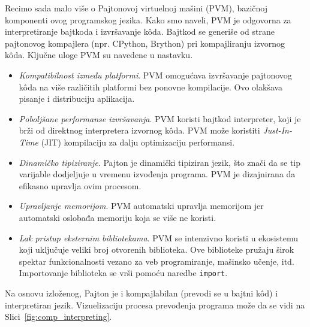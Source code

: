 Recimo sada malo više o Pajtonovoj virtuelnoj mašini (PVM), bazičnoj komponenti ovog programskog jezika. Kako smo naveli, PVM je odgovorna za interpretiranje bajtkoda i izvršavanje k\^oda. Bajtkod se generiše od strane pajtonovog kompajlera (npr. CPython, Brython) pri kompajliranju izvornog k\^oda. Ključne uloge PVM su navedene u nastavku.  
\begin{itemize}
\item \textit{Kompatibilnost između platformi}.  PVM omogućava izvršavanje pajto\-novog k\^oda na više različitih platformi bez ponovne kompi\-lacije. Ovo olakšava pisanje i distribuciju aplikacija.
\item \textit{Poboljšane performanse izvršavanja}.  PVM koristi bajtkod  inter\-preter, koji je brži od direktnog interpretera izvornog k\^oda. PVM može  koristiti \textit{Just-In-Time} (JIT) kompilaciju za dalju optimizaciju perfor\-mansi.
\item \textit{Dinamičko tipiziranje}.  Pajton je dinamički tipiziran jezik, što znači da se tip varijable dodjeljuje u vremenu izvođenja programa. PVM je dizajnirana da efikasno upravlja ovim procesom.
\item  \textit{Upravljanje memorijom}. PVM automatski upravlja memorijom jer  automatski oslobađa memoriju koja se više ne koristi.
\item \textit{Lak pristup eksternim bibliotekama}. PVM se intenzivno koristi u  ekosistemu koji uključuje veliki broj otvorenih biblioteka. Ove bibliote\-ke pružaju širok spektar funkcionalnosti vezano za  veb programiranje, mašinsko učenje, itd. Importovanje biblioteka se vrši pomoću naredbe \texttt{import}. 
\end{itemize}


Na osnovu izloženog, Pajton je i kompajlabilan (prevodi se u bajtni k\^od) i interpretiran jezik. 
Vizuelizaciju procesa prevođenja programa može da se vidi na Slici~\ref{fig:comp_interpreting}.


